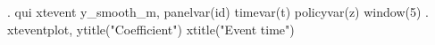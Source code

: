 . qui xtevent y_smooth_m, panelvar(id) timevar(t) policyvar(z) window(5)
{\smallskip}
. xteventplot, ytitle("Coefficient") xtitle("Event time")

